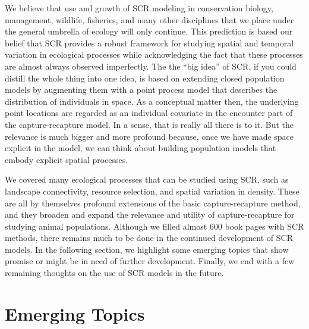 We believe that use and growth of SCR modeling in conservation biology,
management, wildlife, fisheries, and many other disciplines that we place under
the general umbrella of ecology will only continue.
This prediction is based our belief that SCR provides a robust
framework for
studying spatial and temporal variation in ecological processes while acknowledging the fact
that these processes are almost always
observed imperfectly.
The the ``big idea'' of SCR,
if you could distill the whole thing into one idea, is based on
extending closed population models by augmenting them with a point
process model that describes the distribution of individuals
\citep{efford:2004} in space. As a conceptual matter then, the
underlying point locations are regarded as an individual covariate in
the encounter part of the capture-recapture model. In a sense, that is
really all there is to it. But the relevance is much bigger and more
profound because, once we have made space explicit in the model,
we can think about building population models that embody explicit
spatial processes.

We covered many ecological processes that can be studied using SCR,
such as landscape connectivity, resource
selection, and spatial variation in density. These are all by
themselves profound extensions of the basic capture-recapture method,
and they broaden and expand the relevance and utility of
capture-recapture for studying animal populations.
Although we filled almost 600 book pages with SCR methods,
there remains much to be done in the continued development of SCR
models. In the following section, we highlight some emerging topics that show promise or might be in
need of further development. Finally, we end with a few remaining
thoughts on the use of SCR models in the future.



\section{Emerging Topics}

